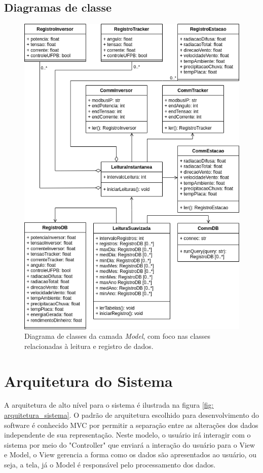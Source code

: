 \documentclass[a4paper,12pt]{article}
\begin{document}
\subsection{Diagramas de classe}

\begin{figure}
    \centering
    \includegraphics[width=\linewidth]{diagrama de classes.drawio.png}
    \caption{Diagrama de classes da camada \textit{Model}, com foco nas classes relacionadas à leitura e registro de dados.}
    \label{fig:diagrama-classes-model}
\end{figure}


\section{Arquitetura do Sistema}
A arquitetura de alto nível para o sistema é ilustrada na figura \ref{fig: arquitetura_sistema}. O padrão de arquitetura escolhido para desenvolvimento do software é conhecido MVC por permitir a separação entre as alterações dos dados independente de sua representação. Neste modelo, o usuário irá interagir com o sistema por meio do "Controller" que enviará a interação do usuário para o View e Model, o View gerencia a forma como os dados são apresentados ao usuário, ou seja, a tela, já o Model é responsável pelo processamento dos dados.
\end{document}
